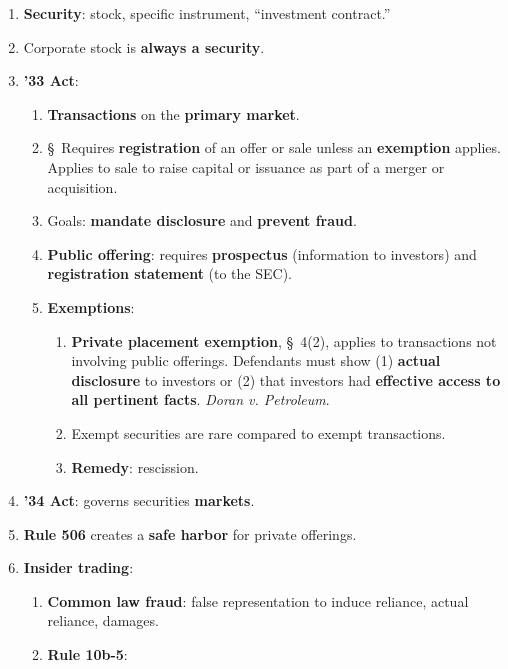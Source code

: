 \begin{enumerate}
    \item \textbf{Security}: stock, specific instrument, ``investment 
    contract.''
    \item Corporate stock is \textbf{always a security}.
    \item \textbf{'33 Act}:
    \begin{enumerate}
        \item \textbf{Transactions} on the \textbf{primary market}.
        \item \S\ Requires \textbf{registration} of an offer or sale unless an 
        \textbf{exemption} applies. Applies to sale to raise capital or 
        issuance as part of a merger or acquisition.
        \item Goals: \textbf{mandate disclosure} and \textbf{prevent fraud}.
        \item \textbf{Public offering}: requires \textbf{prospectus} 
        (information to investors) and \textbf{registration statement} (to the 
        SEC).
        \item \textbf{Exemptions}:
        \begin{enumerate}
            \item \textbf{Private placement exemption}, \S\ 4(2), applies to 
            transactions not involving public offerings. Defendants must show 
            (1) \textbf{actual disclosure} to investors or (2) that investors 
            had \textbf{effective access to all pertinent facts}. \emph{Doran 
            v. Petroleum}.
            \item Exempt securities are rare compared to exempt transactions.
            \item \textbf{Remedy}: rescission.
        \end{enumerate}
    \end{enumerate}
    \item \textbf{'34 Act}: governs securities \textbf{markets}.
    \item \textbf{Rule 506} creates a \textbf{safe harbor} for private 
    offerings.
    \item \textbf{Insider trading}:
    \begin{enumerate}
        \item \textbf{Common law fraud}: false representation to induce 
        reliance, actual reliance, damages.
        \item \textbf{Rule 10b-5}:
        \begin{enumerate}

\end{enumerate}
\end{enumerate}
\end{enumerate}
